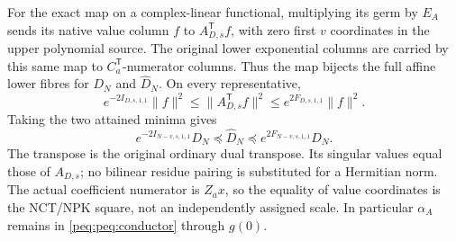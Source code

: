 \documentclass[11pt,a4paper]{article}
\begin{document}
For the exact map on a complex-linear functional, multiplying its germ by $E_A$ sends its native value column $f$ to $A_{D,s}^{\mathsf T}f$, with zero first $v$ coordinates in the upper polynomial source. The original lower exponential columns are carried by this same map to $C_a^{\mathsf T}$-numerator columns. Thus the map bijects the full affine lower fibres for $D_N$ and $\widehat D_N$. On every representative,
\[
 e^{-2I_{D,s,1,1}}\|f\|^2\le
      \|A_{D,s}^{\mathsf T}f\|^2
       \le e^{2F_{D,s,1,1}}\|f\|^2.
\]
Taking the two attained minima gives
\begin{equation}
 \boxed{e^{-2I_{N-v,s,1,1}}D_N
 \preceq\widehat D_N\preceq e^{2F_{N-v,s,1,1}}D_N.}
 \label{peq:peq:native-transfer}
\end{equation}
The transpose is the original ordinary dual transpose. Its singular values equal those of $A_{D,s}$; no bilinear residue pairing is substituted for a Hermitian norm. The actual coefficient numerator is $Z_ax$, so the equality of value coordinates is the NCT/NPK square, not an independently assigned scale. In particular $\alpha_A$ remains in \eqref{peq:peq:conductor} through $g(0)$.
\end{document}
